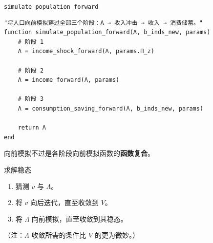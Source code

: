 \documentclass[10pt,aspectratio=169]{beamer}
\begin{document}
\begin{frame}[fragile]{\texttt{simulate\_population\_forward}}
  \begin{lstlisting}
"将人口向前模拟穿过全部三个阶段：Λ → 收入冲击 → 收入 → 消费储蓄。"
function simulate_population_forward(Λ, b_inds_new, params)
    # 阶段 1
    Λ = income_shock_forward(Λ, params.Π_z)

    # 阶段 2
    Λ = income_forward(Λ, params)

    # 阶段 3
    Λ = consumption_saving_forward(Λ, b_inds_new, params)

    return Λ
end
  \end{lstlisting}
  向前模拟不过是各阶段向前模拟函数的\textbf{函数复合}。
\end{frame}


\begin{frame}{求解稳态}
  \begin{enumerate}
    \item 猜测 $v$ 与 $\Lambda$。
    \item 将 $v$ 向后迭代，直至收敛到 $V$。
    \item 将 $\Lambda$ 向前模拟，直至收敛到其稳态。
  \end{enumerate}
  （注：$\Lambda$ 收敛所需的条件比 $V$ 的更为微妙。）
\end{frame}
\end{document}
